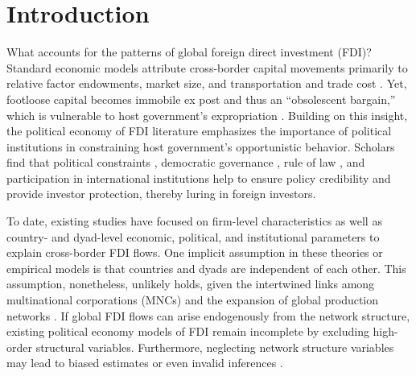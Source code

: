 \documentclass[reqno,onecolumn,letterpaper,12pt]{article}
\begin{document}

\clearpage
\doublespacing
\setcounter{page}{1}
\section{Introduction}


What accounts for the patterns of global foreign direct investment (FDI)? Standard economic models attribute cross-border capital movements primarily to
relative factor endowments, market size, and transportation and trade cost \citep[see,~e.g.,][]{Helpman:1984,Carr_et_al:2001}. Yet, footloose capital becomes
immobile ex post and thus an ``obsolescent bargain,'' which is vulnerable to host government's expropriation \citep{Vernon:1971,Vernon:1980}. Building on this
insight, the political economy of FDI literature emphasizes the importance of political institutions in constraining host government's opportunistic behavior.
Scholars find that political constraints \citep{Henisz:2000}, democratic governance \citep{Jensen:2003,Jensen:2006}, rule of law
\citep{Li_Resnick:2003,Staats_Biglaiser:2012}, and participation in international institutions \citep{Buthe_Milner:2008,Allee_Peinhardt:2011} help to ensure
policy credibility and provide investor protection, thereby luring in foreign investors.

To date, existing studies have focused on firm-level characteristics as well as country- and dyad-level economic, political, and institutional parameters to explain
cross-border FDI flows. One implicit assumption in these theories or empirical models is that countries and dyads are independent of each other. This assumption, nonetheless,
unlikely holds, given the intertwined links among multinational corporations (MNCs) and the expansion of global production networks \citep{UNCTAD:2013}. If
global FDI flows can arise endogenously from the network structure, existing political economy models of FDI remain incomplete by excluding high-order
structural variables. Furthermore, neglecting network structure variables may lead to biased estimates or even invalid inferences
\citep{cranmer2011inferential}.
\end{document}
